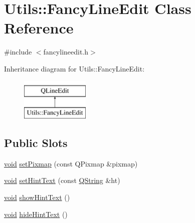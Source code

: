 \hypertarget{class_utils_1_1_fancy_line_edit}{\section{Utils\-:\-:Fancy\-Line\-Edit Class Reference}
\label{class_utils_1_1_fancy_line_edit}
}


{\ttfamily \#include $<$fancylineedit.\-h$>$}

Inheritance diagram for Utils\-:\-:Fancy\-Line\-Edit\-:\begin{figure}[H]
\begin{center}
\leavevmode
\includegraphics[height=2.000000cm]{class_utils_1_1_fancy_line_edit}
\end{center}
\end{figure}
\subsection*{Public Slots}
\begin{DoxyCompactItemize}
\item 
\hyperlink{group___u_a_v_objects_plugin_ga444cf2ff3f0ecbe028adce838d373f5c}{void} \hyperlink{class_utils_1_1_fancy_line_edit_a610964702a440c6b70f3e2678bbc3760}{set\-Pixmap} (const Q\-Pixmap \&pixmap)
\item 
\hyperlink{group___u_a_v_objects_plugin_ga444cf2ff3f0ecbe028adce838d373f5c}{void} \hyperlink{class_utils_1_1_fancy_line_edit_a87b41aad6173d35035122775a73ff9e6}{set\-Hint\-Text} (const \hyperlink{group___u_a_v_objects_plugin_gab9d252f49c333c94a72f97ce3105a32d}{Q\-String} \&ht)
\item 
\hyperlink{group___u_a_v_objects_plugin_ga444cf2ff3f0ecbe028adce838d373f5c}{void} \hyperlink{class_utils_1_1_fancy_line_edit_ad7361e3077f05840dcc003e7453bbecc}{show\-Hint\-Text} ()
\item 
\hyperlink{group___u_a_v_objects_plugin_ga444cf2ff3f0ecbe028adce838d373f5c}{void} \hyperlink{class_utils_1_1_fancy_line_edit_a27d8e4a441c920eb4e683a365fe45dbc}{hide\-Hint\-Text} ()
\end{DoxyCompactItemize}
